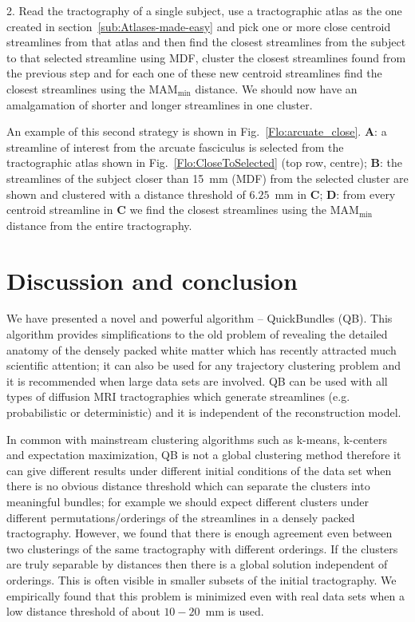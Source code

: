 \documentclass{bioinfo}
\begin{document}
2. Read the tractography of a single subject, use a tractographic atlas
as the one created in section~\ref{sub:Atlases-made-easy} and pick one
or more close centroid streamlines from that atlas and then find the
closest streamlines from the subject to that selected streamline using
MDF, cluster the closest streamlines found from the previous step and
for each one of these new centroid streamlines find the closest
streamlines using the $\textrm{MAM}_{\textrm{min}}$ distance. We should
now have an amalgamation of shorter and longer streamlines in one
cluster.

An example of this second strategy is shown in
Fig.~\ref{Flo:arcuate_close}. \textbf{A}: a streamline of interest from
the arcuate fasciculus is selected from the tractographic atlas shown in
Fig.~\ref{Flo:CloseToSelected} (top row, centre); \textbf{B}: the
streamlines of the subject closer than 15~mm (MDF) from the selected
cluster are shown and clustered with a distance threshold of $6.25$~mm
in \textbf{C}; \textbf{D}: from every centroid streamline in \textbf{C}
we find the closest streamlines using the $\textrm{MAM}_{\textrm{min}}$
distance from the entire tractography.

\section{Discussion and conclusion}

We have presented a novel and powerful algorithm -- QuickBundles
(QB). This algorithm provides simplifications to the old problem of
revealing the detailed anatomy of the densely packed white matter which
has recently attracted much scientific attention; it can also be used
for any trajectory clustering problem and it is recommended when large
data sets are involved. QB can be used with all types of diffusion MRI
tractographies which generate streamlines (e.g. probabilistic or
deterministic) and it is independent of the reconstruction model.

In common with mainstream clustering algorithms such as k-means,
k-centers and expectation maximization, QB is not a global clustering
method therefore it can give different results under different initial
conditions of the data set when there is no obvious distance threshold
which can separate the clusters into meaningful bundles; for example we
should expect different clusters under different permutations/orderings
of the streamlines in a densely packed tractography. However, we found
that there is enough agreement even between two clusterings of the same
tractography with different orderings. If the clusters are truly
separable by distances then there is a global solution independent of
orderings. This is often visible in smaller subsets of the initial
tractography. We empirically found that this problem is minimized even
with real data sets when a low distance threshold of about $10-20$~mm is
used.
\end{document}
